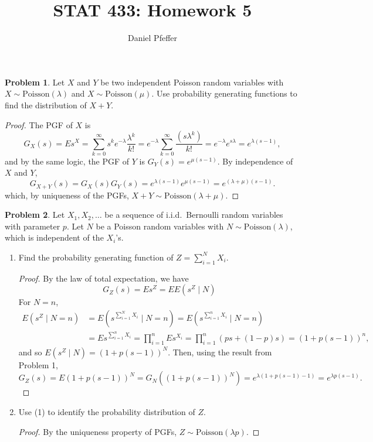 \documentclass[oneside,reqno]{amsart}
\title{STAT 433: Homework 5}
\author{Daniel Pfeffer}
\newcommand{\Pois}{\mathrm{Poisson}}
\theoremstyle{definition}
\newtheorem{prob}{Problem}
\begin{document}
\maketitle

\begin{prob}
Let $X$ and $Y$ be two independent Poisson random variables with $X \sim \Pois(\lambda)$ and $X \sim \Pois(\mu)$. Use probability generating functions to find the distribution of $X+Y$. 
\end{prob}

\begin{proof}
The PGF of $X$ is
\[
	G_X(s) = E s^X = \sum_{k=0}^\infty s^k e^{-\lambda} \frac{\lambda^k}{k!} = e^{-\lambda} \sum_{k=0}^\infty \frac{(s\lambda^k)}{k!} = e^{-\lambda} e^{s\lambda} = e^{\lambda(s-1)},
\]
and by the same logic, the PGF of $Y$ is $G_Y(s) =  e^{\mu(s-1)}$. By independence of $X$ and $Y$,
\[
	G_{X+Y}(s) = G_X(s)G_Y(s) = e^{\lambda(s-1)}e^{\mu(s-1)} = e^{(\lambda + \mu)(s-1)}.
\]
which, by uniqueness of the PGFs, $X+Y\sim \Pois(\lambda + \mu)$.
\end{proof}

\begin{prob}
Let $X_1, X_2, \dotsc$ be a sequence of i.i.d.\ Bernoulli random variables with parameter $p$. Let $N$ be a Poisson random variables with $N \sim \Pois(\lambda)$, which is independent of the $X_i$'s. 
\end{prob}

\begin{enumerate}
\item
Find the probability generating function of $Z=\sum_{i=1}^N X_i$.
\begin{proof}
By the law of total expectation, we have
\[
	G_Z(s) = E s^Z = E E(s^Z \mid N)
\]
For $N=n$, 
\begin{align*}
	E(s^Z \mid N= n) &= E(s^{\sum_{i=1}^N X_i} \mid N = n) 
	= E(s^{\sum_{i=1}^n X_i} \mid N = n)  \\
	&= E s^{\sum_{i=1}^n X_i}  
	= \prod_{i=1}^n E s^{X_i}
	= \prod_{i=1}^n (ps + (1-p)s) = (1 + p(s-1))^n,
\end{align*}
and so $E(s^Z \mid N)= (1 + p(s-1))^N$. Then, using the result from Problem 1, 
\[
	G_Z(s) = E (1+p(s-1))^N  = G_N((1+p(s-1))^N ) = e^{\lambda(1+p(s-1) - 1)} = e^{\lambda p(s-1)}.
\]
\end{proof}

\item
Use (1) to identify the probability distribution of $Z$.  
\begin{proof}
By the uniqueness property of PGFs, $Z \sim \Pois(\lambda p)$.
\end{proof}
\end{enumerate}
\end{document}
